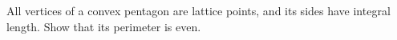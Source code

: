 All vertices of a convex pentagon are lattice points, and its sides have integral length. Show that its perimeter is even.
